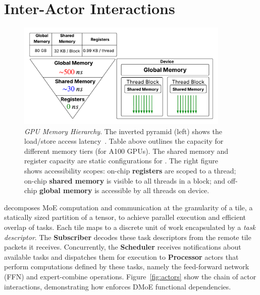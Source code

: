 \section{Inter-Actor Interactions}\label{sec:inter-actor-interactions}
\begin{figure}[!ht]
    \centering
    \includegraphics[width=4in, keepaspectratio]{figures/mem}
    \caption{\emph{GPU Memory Hierarchy}.
    The inverted pyramid (left) shows the load/store access latency~\cite{10579250, amperearch, ptx}. Table above outlines the capacity for different memory tiers (for A100 GPUs). The shared memory and register capacity are static configurations for \sysname.
    The right figure shows accessibility scopes: on-chip \textbf{registers}
    are scoped to a thread; on-chip \textbf{shared memory} is visible to all threads in a block;
    and off-chip \textbf{global memory} is accessible by all threads on device.}
    \label{fig:mem}
\end{figure}
\sysname decomposes MoE computation and communication at the granularity of a tile, a statically sized partition of a tensor,
to achieve parallel execution and efficient overlap of tasks.
Each tile maps to a discrete unit of work encapsulated by a \emph{task descriptor}.
The \textbf{Subscriber} decodes these task descriptors from the remote tile packets it receives.
Concurrently, the \textbf{Scheduler} receives notifications about available tasks and dispatches them for execution
to \textbf{Processor} actors that perform computations defined by these tasks,
namely the feed-forward network (FFN) and expert-combine operations.
Figure~\ref{fig:actors} show the chain of actor interactions, demonstrating how \sysname
enforces DMoE functional dependencies.
